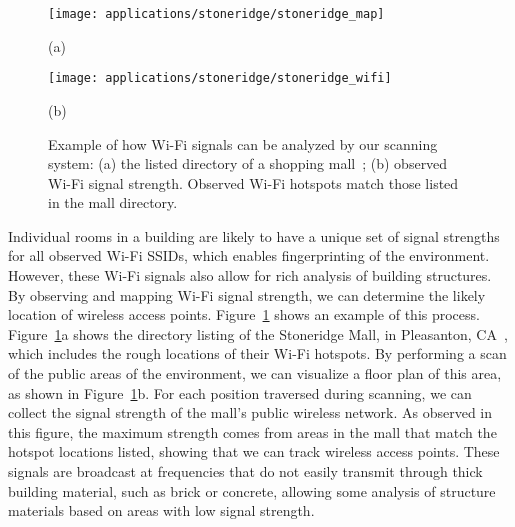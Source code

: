 \documentclass[12pt,onecolumn,oneside]{book}
\begin{document}
\begin{figure}[t]

	\begin{minipage}[t]{0.49\linewidth}
		\centerline{\texttt{[image: applications/stoneridge/stoneridge\_map]}}
		\centerline{(a)}
	\end{minipage}
	\hfill
	\begin{minipage}[t]{0.49\linewidth}
		\centerline{\texttt{[image: applications/stoneridge/stoneridge\_wifi]}}
		\centerline{(b)}
	\end{minipage}
	
	\caption[Analysis of Wi-Fi signals in scans.]{Example of how Wi-Fi signals can be analyzed by our scanning system: (a) the listed directory of a shopping mall~\cite{Stoneridge}; (b) observed Wi-Fi signal strength.  Observed Wi-Fi hotspots match those listed in the mall directory.}
	\label{fig:stoneridge_wifi}
\end{figure}

Individual rooms in a building are likely to have a unique set of signal strengths for all observed Wi-Fi SSIDs, which enables fingerprinting of the environment.  However, these Wi-Fi signals also allow for rich analysis of building structures.  By observing and mapping Wi-Fi signal strength, we can determine the likely location of wireless access points.  Figure~\ref{fig:stoneridge_wifi} shows an example of this process.  Figure~\ref{fig:stoneridge_wifi}a shows the directory listing of the Stoneridge Mall, in Pleasanton, CA~\cite{Stoneridge}, which includes the rough locations of their Wi-Fi hotspots.  By performing a scan of the public areas of the environment, we can visualize a floor plan of this area, as shown in Figure~\ref{fig:stoneridge_wifi}b.  For each position traversed during scanning, we can collect the signal strength of the mall's public wireless network.  As observed in this figure, the maximum strength comes from areas in the mall that match the hotspot locations listed, showing that we can track wireless access points.  These signals are broadcast at frequencies that do not easily transmit through thick building material, such as brick or concrete, allowing some analysis of structure materials based on areas with low signal strength.

\end{document}
